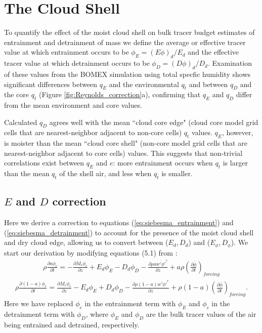 \documentclass[12pt]{article}
\begin{document}

\section{The Cloud Shell}

To quantify the effect of the moist cloud shell on bulk tracer budget 
estimates of entrainment and detrainment of mass we define the average 
or effective tracer value at which entrainment occurs to be 
$\phi_E = (E\phi)_d / E_d$ and the effective tracer value at which 
detrainment occurs to be $\phi_D = (D\phi)_d / D_d$.  Examination of 
these values from the BOMEX simulation using total specfic humidity shows 
significant differences between $q_E$ and the environmental $q_t$ and 
between $q_D$ and the core $q_t$ (Figure \ref{fig:Reynolds_correction}a), 
confirming that $q_E$ and $q_D$ differ from the mean environment and 
core values.

Calculated $q_D$ agrees well with the mean ``cloud core edge" (cloud core model 
grid cells that are nearest-neighbor adjacent to non-core cells) $q_t$ values.  
$q_E$, however, is moister than the mean ``cloud core shell" (non-core model 
grid cells that are nearest-neighbor adjacent to core cells) values.  This 
suggests that non-trivial correlations exist between $q_E$ and $e$: more 
entrainment occurs when $q_t$ is larger than the mean $q_t$ of the shell air, 
and less when $q_t$ is smaller.


\subsection{$E$ and $D$ correction}
  
Here we derive a correction to equations (\ref{eq:siebesma_entrainment}) and 
(\ref{eq:siebesma_detrainment}) to account for the presence of the moist cloud 
shell and dry cloud edge, allowing us to convert between ($E_d, D_d$) and 
($E_\phi, D_\phi$).  We start our derivation by modifying equations (5.1) from
\cite{Siebesma1995}:
\begin{eqnarray}
  \label{eq:entrainment_derivation_1}
    \rho \frac{\partial a \phi_c}{\partial t} 
    = - \frac{\partial M_c \phi_c}{\partial z} 
    + E_d \phi_E - D_d \phi_D
    - \frac{\partial \rho a \overline{w' \phi'}^c}{\partial z} 
    + a \rho \left(\frac{\partial \bar{\phi}}{\partial t}\right)_{forcing}
\end{eqnarray}
\begin{eqnarray}
  \label{eq:detrainment_derivation_1}
    \rho \frac{\partial (1 - a) \phi_e}{\partial t}
    = \frac{\partial M_c \phi_e}{\partial z} 
    - E_d \phi_E + D_d \phi_D
    - \frac{\partial \rho (1 - a) \overline{w' \phi'}^e}{\partial z} 
    + \rho (1 - a) \left(\frac{\partial \bar{\phi}}{\partial t}\right)_{forcing}.
\end{eqnarray}
Here we have replaced $\phi_e$ in the entrainment term with $\phi_E$ and 
$\phi_c$ in the detrainment term with $\phi_D$, where $\phi_E$ and $\phi_D$ are 
the bulk tracer values of the air being entrained and detrained, respectively.
\end{document}
